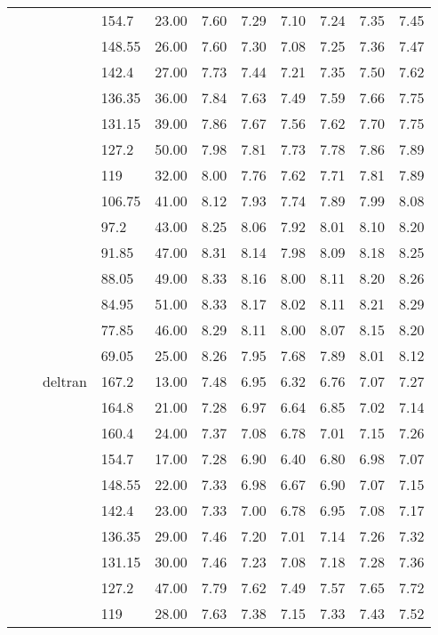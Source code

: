 \begin{longtable}{llllrrrrrrr}
   &  &  & 154.7 & 23.00 & 7.60 & 7.29 & 7.10 & 7.24 & 7.35 & 7.45 \\ 
   &  &  & 148.55 & 26.00 & 7.60 & 7.30 & 7.08 & 7.25 & 7.36 & 7.47 \\ 
   &  &  & 142.4 & 27.00 & 7.73 & 7.44 & 7.21 & 7.35 & 7.50 & 7.62 \\ 
   &  &  & 136.35 & 36.00 & 7.84 & 7.63 & 7.49 & 7.59 & 7.66 & 7.75 \\ 
   &  &  & 131.15 & 39.00 & 7.86 & 7.67 & 7.56 & 7.62 & 7.70 & 7.75 \\ 
   &  &  & 127.2 & 50.00 & 7.98 & 7.81 & 7.73 & 7.78 & 7.86 & 7.89 \\ 
   &  &  & 119 & 32.00 & 8.00 & 7.76 & 7.62 & 7.71 & 7.81 & 7.89 \\ 
   &  &  & 106.75 & 41.00 & 8.12 & 7.93 & 7.74 & 7.89 & 7.99 & 8.08 \\ 
   &  &  & 97.2 & 43.00 & 8.25 & 8.06 & 7.92 & 8.01 & 8.10 & 8.20 \\ 
   &  &  & 91.85 & 47.00 & 8.31 & 8.14 & 7.98 & 8.09 & 8.18 & 8.25 \\ 
   &  &  & 88.05 & 49.00 & 8.33 & 8.16 & 8.00 & 8.11 & 8.20 & 8.26 \\ 
   &  &  & 84.95 & 51.00 & 8.33 & 8.17 & 8.02 & 8.11 & 8.21 & 8.29 \\ 
   &  &  & 77.85 & 46.00 & 8.29 & 8.11 & 8.00 & 8.07 & 8.15 & 8.20 \\ 
   &  &  & 69.05 & 25.00 & 8.26 & 7.95 & 7.68 & 7.89 & 8.01 & 8.12 \\ 
   &  & deltran & 167.2 & 13.00 & 7.48 & 6.95 & 6.32 & 6.76 & 7.07 & 7.27 \\ 
   &  &  & 164.8 & 21.00 & 7.28 & 6.97 & 6.64 & 6.85 & 7.02 & 7.14 \\ 
   &  &  & 160.4 & 24.00 & 7.37 & 7.08 & 6.78 & 7.01 & 7.15 & 7.26 \\ 
   &  &  & 154.7 & 17.00 & 7.28 & 6.90 & 6.40 & 6.80 & 6.98 & 7.07 \\ 
   &  &  & 148.55 & 22.00 & 7.33 & 6.98 & 6.67 & 6.90 & 7.07 & 7.15 \\ 
   &  &  & 142.4 & 23.00 & 7.33 & 7.00 & 6.78 & 6.95 & 7.08 & 7.17 \\ 
   &  &  & 136.35 & 29.00 & 7.46 & 7.20 & 7.01 & 7.14 & 7.26 & 7.32 \\ 
   &  &  & 131.15 & 30.00 & 7.46 & 7.23 & 7.08 & 7.18 & 7.28 & 7.36 \\ 
   &  &  & 127.2 & 47.00 & 7.79 & 7.62 & 7.49 & 7.57 & 7.65 & 7.72 \\ 
   &  &  & 119 & 28.00 & 7.63 & 7.38 & 7.15 & 7.33 & 7.43 & 7.52 \\ 

\end{longtable}
